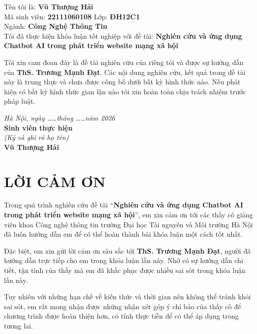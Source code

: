 \documentclass[13pt,a4paper,oneside]{extreport}
\numberwithin{equation}{chapter}
\numberwithin{figure}{chapter}
\numberwithin{table}{chapter}
\begin{document}
\begin{flushleft}
  Tên tôi là: \textbf{Vũ Thượng Hải}\\[0.8em]
  Mã sinh viên: \textbf{22111060108} \hspace{2cm} Lớp: \textbf{ĐH12C1}\\[0.8em]
  Ngành: \textbf{Công Nghệ Thông Tin}\\[0.8em]
  Tôi đã thực hiện khóa luận tốt nghiệp với đề tài: \textbf{Nghiên cứu và ứng dụng Chatbot AI trong phát triển website mạng xã hội}
\end{flushleft}

Tôi xin cam đoan đây là đề tài nghiên cứu của riêng tôi và được sự hướng dẫn của \textbf{ThS. Trương Mạnh Đạt}. Các nội dung nghiên cứu, kết quả trong đề tài này là trung thực và chưa được công bố dưới bất kỳ hình thức nào. Nếu phát hiện có bất kỳ hình thức gian lận nào tôi xin hoàn toàn chịu trách nhiệm trước pháp luật.\\[1em]

\begin{flushright}
  \begin{minipage}{8cm}
    \centering
    \textit{Hà Nội, ngày \dots\dots tháng \dots\dots năm 2026}\\[1.5em]
    \textbf{Sinh viên thực hiện}\\
    \textit{(Ký và ghi rõ họ tên)}\\[2.5cm]
    \textbf{Vũ Thượng Hải}
  \end{minipage}
\end{flushright}

\clearpage
\chapter*{LỜI CẢM ƠN}

Trong quá trình nghiên cứu đề tài “\textbf{Nghiên cứu và ứng dụng Chatbot AI trong phát triển website mạng xã hội}”, em xin cảm ơn tới các thầy cô giảng viên khoa Công nghệ thông tin trường Đại học Tài nguyên và Môi trường Hà Nội đã luôn hướng dẫn em để có thể hoàn thành bài khóa luận một cách tốt nhất.

Đặc biệt, em xin gửi lời cảm ơn sâu sắc tới \textbf{ThS. Trương Mạnh Đạt}, người đã hướng dẫn trực tiếp cho em trong khóa luận lần này. Nhờ có sự hướng dẫn chi tiết, tận tình của thầy mà em đã khắc phục được nhiều sai sót trong khóa luận lần này.

Tuy nhiên với những hạn chế về kiến thức và thời gian nên không thể tránh khỏi sai sót, em rất mong nhận được những nhận xét góp ý chỉ bảo của thầy cô để chương trình được hoàn thiện hơn, có tính thực tiễn để có thể áp dụng trong tương lai.
\end{document}

